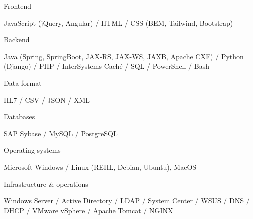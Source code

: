 


\begin{cventries}

\cventrytitleanddescription
    {Frontend}
    {
    JavaScript (jQuery, Angular) / HTML / CSS (BEM, Tailwind, Bootstrap)
    
    }
 \cventrytitleanddescription
    {Backend}
    {
    Java (Spring, SpringBoot, JAX-RS, JAX-WS, JAXB, Apache CXF) / Python (Django) / PHP / InterSystems Caché / SQL / PowerShell / Bash
    
    }
    
    
 \cventrytitleanddescription
    {Data format}
    {
    HL7 / CSV / JSON / XML
    
    }
    
    
 \cventrytitleanddescription
    {Databases}
    {
    SAP Sybase / MySQL / PostgreSQL
    
    }
    
 \cventrytitleanddescription
    {Operating systems}
    {
    Microsoft Windows / Linux (REHL, Debian, Ubuntu), MacOS
    
    }
    
 \cventrytitleanddescription
    {Infrastructure \& operations}
    {
    Windows Server / Active Directory / LDAP / System Center / WSUS / DNS / DHCP / VMware vSphere / Apache Tomcat / NGINX
    
    }

\end{cventries}
